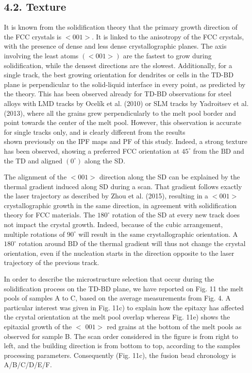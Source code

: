 \documentclass[10pt]{article}
\begin{document}
\subsection*{4.2. Texture}
It is known from the solidification theory that the primary growth direction of the FCC crystals is $<001>$. It is linked to the anisotropy of the FCC crystals, with the presence of dense and less dense crystallographic planes. The axis involving the least atoms $(<001>)$ are the fastest to grow during solidification, while the densest directions are the slowest. Additionally, for a single track, the best growing orientation for dendrites or cells in the TD-BD plane is perpendicular to the solid-liquid interface in every point, as predicted by the theory. This has been observed already for TD-BD observations for steel alloys with LMD tracks by Ocelík et al. (2010) or SLM tracks by Yadroitsev et al. (2013), where all the grains grew perpendicularly to the melt pool border and point towards the center of the melt pool. However, this observation is accurate for single tracks only, and is clearly different from the results\\
shown previously on the IPF maps and PF of this study. Indeed, a strong texture has been observed, showing a preferred FCC orientation at $45^{\circ}$ from the $\mathrm{BD}$ and the $\mathrm{TD}$ and aligned $\left(0^{\circ}\right)$ along the SD.

The alignment of the $<001>$ direction along the SD can be explained by the thermal gradient induced along SD during a scan. That gradient follows exactly the laser trajectory as described by Zhou et al. (2015), resulting in a $<001>$ crystallographic growth in the same direction, in agreement with solidification theory for FCC materials. The $180^{\circ}$ rotation of the SD at every new track does not impact the crystal growth. Indeed, because of the cubic arrangement, multiple rotations of $90^{\circ}$ will result in the same crystallographic orientation. A $180^{\circ}$ rotation around $\mathrm{BD}$ of the thermal gradient will thus not change the crystal orientation, even if the nucleation starts in the direction opposite to the laser trajectory of the previous track.

In order to describe the microstructure selection that occur during the solidification process on the TD-BD plane, we have reported on Fig. 11 the melt pools of samples A to C, based on the average measurements from Fig. 4. A particular interest was given in Fig. 11c) to explain how the epitaxy has affected the crystal orientation at the melt pool overlap whereas Fig. 11e) shows the epitaxial growth of the $<$ $001>$ red grains at the bottom of the melt pools as observed for sample B. The scan order considered in the figure is from right to left, and the building direction is from bottom to top, according to the samples processing parameters. Consequently (Fig. 11c), the fusion bead chronology is A/B/C/D/E/F.
\end{document}
